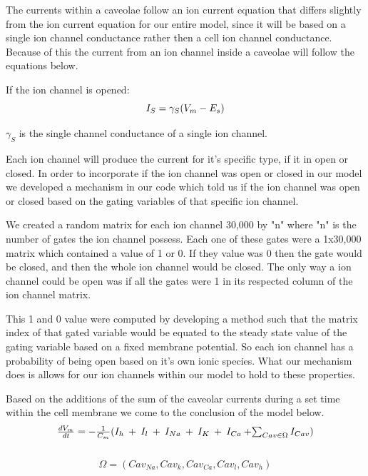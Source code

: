 \documentclass{bmcart}%
\begin{document}
The currents within a caveolae follow an ion current equation that differs slightly from the ion current equation for our entire model, since it will be based on a single ion channel conductance rather then a cell ion channel conductance. Because of this the current from an ion channel inside a caveolae will follow the equations below\cite{Ronald2007}.

If the ion channel is opened:
\begin{equation}
\\
  $$
   I_S = \gamma_S \color{black} (V_m - E_s)
  $$
\label{CavCurrentEqu}
\end{equation}

\begin{math} \gamma_S \end{math} is the single channel conductance of a single ion channel.

Each ion channel will produce the current for it's specific type, if it in open or closed. In order to incorporate if the ion channel was open or closed in our model we developed a mechanism in our code which told us if the ion channel was open or closed based on the gating variables of that specific ion channel. 

We created a random matrix for each ion channel 30,000 by "n" where "n" is the number of gates the ion channel possess. Each one of these gates were a 1x30,000 matrix which contained a value of 1 or 0. If they value was 0 then the gate would be closed, and then the whole ion channel would be closed. The only way a ion channel could be open was if all the gates were 1 in its respected column of the ion channel matrix.

This 1 and 0 value were computed by developing a method such that the matrix index of that gated variable would be equated to the steady state value of the gating variable based on a fixed membrane potential. So each ion channel has a probability of being open based on it's own ionic species. What our mechanism does is allows for our ion channels within our model to hold to these properties. 
    
Based on the additions of the sum of the caveolar currents during a set time within the cell membrane we come to the conclusion of the model below. 
\begin{equation}
\\
 $$
\frac {d V_m}{d t} = - \frac {1}{C_m}(I_h \: + \: I_l \: + \:I_{Na} \: + \: I_K \: + \: I_{Ca} \: + $$ $$ \sum \nolimits_{Cav \in \Omega} I_{Cav})
$$
\label{OurModel}
\end{equation}
\\
$$
 \Omega = (Cav_{Na}, Cav_k, Cav_{Ca}, Cav_l, Cav_h)
$$
\end{document}
